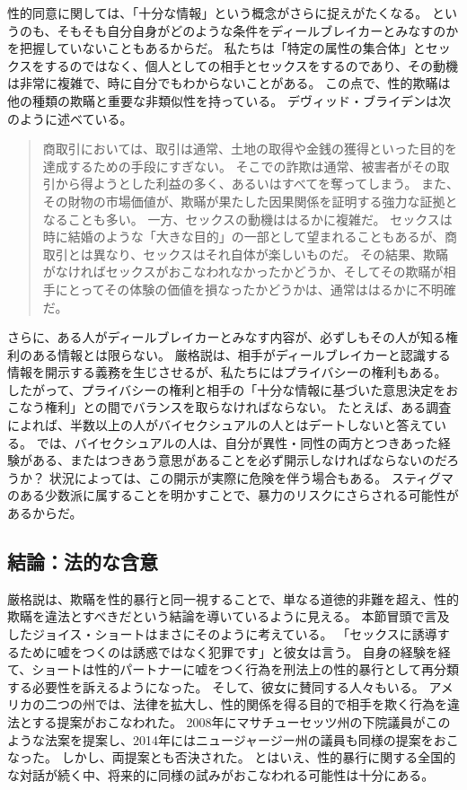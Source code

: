 \documentclass[paper=a4,book,openany]{jlreq}
\begin{document}
性的同意に関しては、「十分な情報」という概念がさらに捉えがたくなる。
というのも、そもそも自分自身がどのような条件をディールブレイカーとみなすのかを把握していないこともあるからだ。
私たちは「特定の属性の集合体」とセックスをするのではなく、個人としての相手とセックスをするのであり、その動機は非常に複雑で、時に自分でもわからないことがある。
この点で、性的欺瞞は他の種類の欺瞞と重要な非類似性を持っている。
デヴィッド・ブライデンは次のように述べている。
\begin{quote}
商取引においては、取引は通常、土地の取得や金銭の獲得といった目的を達成するための手段にすぎない。
そこでの詐欺は通常、被害者がその取引から得ようとした利益の多く、あるいはすべてを奪ってしまう。
また、その財物の市場価値が、欺瞞が果たした因果関係を証明する強力な証拠となることも多い。
一方、セックスの動機ははるかに複雑だ。
セックスは時に結婚のような「大きな目的」の一部として望まれることもあるが、商取引とは異なり、セックスはそれ自体が楽しいものだ。
その結果、欺瞞がなければセックスがおこなわれなかったかどうか、そしてその欺瞞が相手にとってその体験の価値を損なったかどうかは、通常ははるかに不明確だ。
\citep[p.463]{bryden00:_redef_rape}

\end{quote}

さらに、ある人がディールブレイカーとみなす内容が、必ずしもその人が知る権利のある情報とは限らない。
厳格説は、相手がディールブレイカーと認識する情報を開示する義務を生じさせるが、私たちにはプライバシーの権利もある。
したがって、プライバシーの権利と相手の「十分な情報に基づいた意思決定をおこなう権利」との間でバランスを取らなければならない。
たとえば、ある調査によれば、半数以上の人がバイセクシュアルの人とはデートしないと答えている\citep{thorpe16:_why_won_some_peopl_date_bisex}。
では、バイセクシュアルの人は、自分が異性・同性の両方とつきあった経験がある、またはつきあう意思があることを必ず開示しなければならないのだろうか？ 状況によっては、この開示が実際に危険を伴う場合もある。
スティグマのある少数派に属することを明かすことで、暴力のリスクにさらされる可能性があるからだ。

\subsection{結論：法的な含意}

厳格説は、欺瞞を性的暴行と同一視することで、単なる道徳的非難を超え、性的欺瞞を違法とすべきだという結論を導いているように見える。
本節冒頭で言及したジョイス・ショートはまさにそのように考えている。
「セックスに誘導するために嘘をつくのは誘惑ではなく犯罪です」と彼女は言う\citep{mcarthur16:_is_lying_get_laid_form_sexual_assaul}。
自身の経験を経て、ショートは性的パートナーに嘘をつく行為を刑法上の性的暴行として再分類する必要性を訴えるようになった。
そして、彼女に賛同する人々もいる。
アメリカの二つの州では、法律を拡大し、性的関係を得る目的で相手を欺く行為を違法とする提案がおこなわれた。
2008年にマサチューセッツ州の下院議員がこのような法案を提案し、2014年にはニュージャージー州の議員も同様の提案をおこなった。
しかし、両提案とも否決された。
とはいえ、性的暴行に関する全国的な対話が続く中、将来的に同様の試みがおこなわれる可能性は十分にある。
\end{document}

